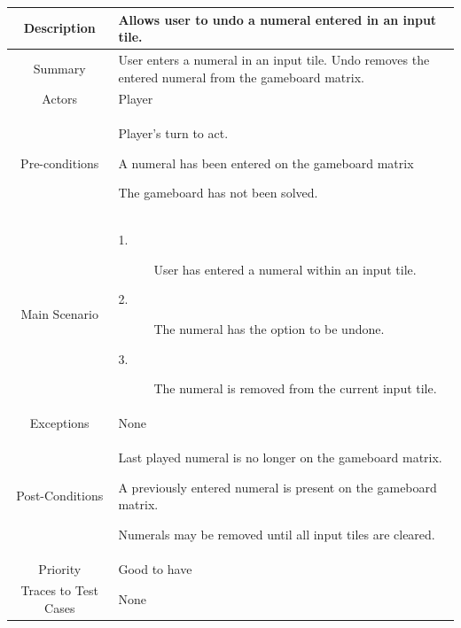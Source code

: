 \documentclass[12pt]{article}
\begin{document}
\begin{table}[htbp]
\begin{center}
\begin{tabular}{| c | m{10cm} |}
\hline
\cellcolor{lightgray}Description & Allows user to undo a numeral entered in an input tile. \\
\hline
\cellcolor{lightgray}Summary & User enters a numeral in an input tile. Undo removes the entered numeral from the gameboard matrix. \\
\hline
\cellcolor{lightgray}Actors & Player \\
\hline
\cellcolor{lightgray}Pre-conditions &
\begin{description}[font=$\bullet$~\normalfont\scshape]
\item Player's turn to act.
\item A numeral has been entered on the gameboard matrix 
\item The gameboard has not been solved.
\end{description}\\
\hline
\cellcolor{lightgray}Main Scenario & 
\begin{description}
\item [1.]User has entered a numeral within an input tile.
\item [2.]The numeral has the option to be undone.
\item [3.]The numeral is removed from the current input tile.
\end{description}\\
\hline
\cellcolor{lightgray}Exceptions & None \\
\hline
\cellcolor{lightgray}Post-Conditions & 
\begin{description}[font=$\bullet$~\normalfont\scshape]
\item Last played numeral is no longer on the gameboard matrix.
\item A previously entered numeral is present on the gameboard matrix.
\item Numerals may be removed until all input tiles are cleared.
\end{description}\\
\hline
\cellcolor{lightgray}Priority & Good to have \\
\hline
\cellcolor{lightgray}Traces to Test Cases & None \\
\hline
\end{tabular}
\end{center}
\end{table}
\newpage
\pagestyle{plain} 
\end{document}
